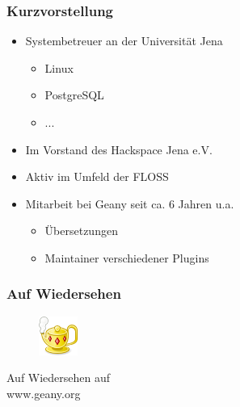
%

\frame{\titlepage}
\frame{\tableofcontents}
\begin{frame}
	\frametitle{Kurzvorstellung}
	\begin{block}{}
		\begin{itemize}
			\item Systembetreuer an der Universität Jena 
				\begin{itemize}
					\item Linux
					\item PostgreSQL
					\item ...
				\end{itemize}
			\item Im Vorstand des Hackspace Jena e.V.
			\item Aktiv im Umfeld der FLOSS
			\item Mitarbeit bei Geany seit ca. 6 Jahren u.a. 
			\begin{itemize}
				\item Übersetzungen
				\item Maintainer verschiedener Plugins
			\end{itemize}
		\end{itemize}
	\end{block}
\end{frame}



%
%





\begin{frame}[plain]
	\frametitle{Auf Wiedersehen}
	\begin{figure}[ht]
		\includegraphics{../img/geany.png}
	\end{figure}

	\begin{center}
	\huge Auf Wiedersehen auf \\ www.geany.org
	\end{center}
\end{frame}


